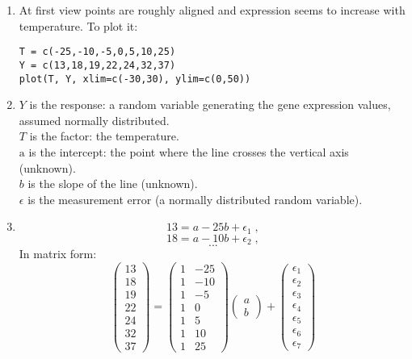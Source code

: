 \documentclass[a4paper,11pt]{article}
\begin{document}
\begin{enumerate}
\item At first view points are roughly aligned and expression seems to increase with temperature. To plot it:
\begin{verbatim}
T = c(-25,-10,-5,0,5,10,25)
Y = c(13,18,19,22,24,32,37)
plot(T, Y, xlim=c(-30,30), ylim=c(0,50))
\end{verbatim}

\item 
$Y$ is the response: a random variable generating the gene expression values, assumed normally distributed. \\
$T$ is the factor: the temperature. \\
$\text{a}$ is the intercept: the point where the line crosses the vertical axis (unknown). \\
$b$ is the slope of the line (unknown). \\
$\epsilon$ is the measurement error (a normally distributed random variable).

\item 
$$13 = a -25 b + \epsilon_1 \; ,$$
$$18 = a -10 b + \epsilon_2 \; ,$$
$$...$$
In matrix form:
$$
\left(
\begin{array}{l}
13 \\ 18 \\ 19 \\ 22 \\ 24 \\ 32 \\ 37 
\end{array}
\right)
=
\left(
\begin{array}{ccccccc}
1 & -25 \\ 
1 & -10 \\ 
1 & -5 \\ 
1 & 0 \\ 
1 & 5 \\ 
1 & 10 \\ 
1 & 25 
\end{array}
\right)
\left(
\begin{array}{c}
a \\ b
\end{array}
\right)
+
\left(
\begin{array}{l}
\epsilon_1 \\ \epsilon_2 \\ \epsilon_3 \\ \epsilon_4 \\ \epsilon_5 \\ \epsilon_6 \\ \epsilon_7 
\end{array}
\right)
$$


\end{enumerate}
\end{document}
